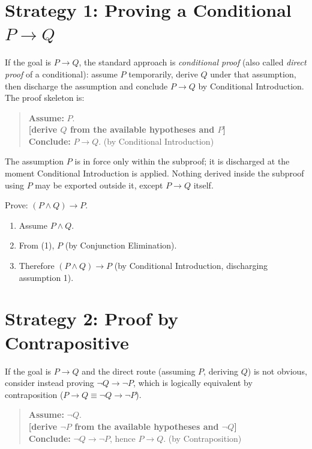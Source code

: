 \section*{Strategy 1: Proving a Conditional $P \to Q$}

If the goal is $P \to Q$, the standard approach is \emph{conditional proof}
(also called \emph{direct proof} of a conditional): assume $P$ temporarily,
derive $Q$ under that assumption, then discharge the assumption and conclude
$P \to Q$ by Conditional Introduction. The proof skeleton is:

\begin{quote}
\textbf{Assume:} $P$. \\
\textbf{[derive $Q$ from the available hypotheses and $P$]} \\
\textbf{Conclude:} $P \to Q$. \quad (by Conditional Introduction)
\end{quote}

The assumption $P$ is in force only within the subproof; it is discharged at
the moment Conditional Introduction is applied. Nothing derived inside the
subproof using $P$ may be exported outside it, except $P \to Q$ itself.

\begin{example}
Prove: $(P \wedge Q) \to P$.

\begin{enumerate}
\item Assume $P \wedge Q$.
\item From (1), $P$ \quad (by Conjunction Elimination).
\item Therefore $(P \wedge Q) \to P$ \quad (by Conditional Introduction, discharging assumption 1).
\end{enumerate}
\end{example}


\section*{Strategy 2: Proof by Contrapositive}

If the goal is $P \to Q$ and the direct route (assuming $P$, deriving $Q$) is
not obvious, consider instead proving $\neg Q \to \neg P$, which is logically
equivalent by contraposition ($P \to Q \equiv \neg Q \to \neg P$).

\begin{quote}
\textbf{Assume:} $\neg Q$. \\
\textbf{[derive $\neg P$ from the available hypotheses and $\neg Q$]} \\
\textbf{Conclude:} $\neg Q \to \neg P$, hence $P \to Q$. \quad (by Contraposition)
\end{quote}

